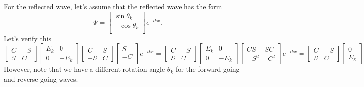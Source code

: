 {
%
For the reflected wave, let's assume that the reflected wave has the form
%
\begin{dmath}\label{eqn:qmLecture9Problems:680}
\Psi =
\begin{bmatrix}
\sin\theta_k \\
-\cos\theta_k \\
\end{bmatrix}
e^{-i k x }.
\end{dmath}
%
Let's verify this
%
\begin{dmath}\label{eqn:qmLecture9Problems:700}
\begin{bmatrix}
C & - S \\
S & C
\end{bmatrix}
\begin{bmatrix}
E_k & 0 \\
0 & -E_k
\end{bmatrix}
\begin{bmatrix}
C & S \\
-S & C
\end{bmatrix}
\begin{bmatrix}
S \\
-C \\
\end{bmatrix}
e^{-i k x}
=
\begin{bmatrix}
C & - S \\
S & C
\end{bmatrix}
\begin{bmatrix}
E_k & 0 \\
0 & -E_k
\end{bmatrix}
\begin{bmatrix}
C S - S C \\
-S^2 - C^2
\end{bmatrix}
e^{-i k x}
=
\begin{bmatrix}
C & - S \\
S & C
\end{bmatrix}
\begin{bmatrix}
0 \\
E_k
\end{bmatrix}
e^{-i k x}
=
E_k
\begin{bmatrix}
- S \\
C
\end{bmatrix}
e^{-i k x}
=
-E_k
\begin{bmatrix}
S \\
-C
\end{bmatrix}
e^{-i k x}.
\end{dmath}
%
However, note that we have a different rotation angle \( \theta_k \) for the forward going and reverse going waves.

}

